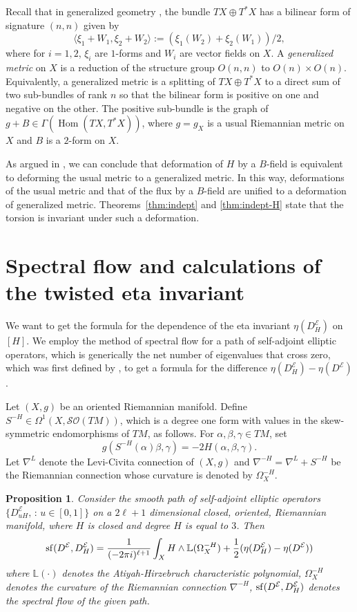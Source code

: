 \documentclass[12pt]{amsart}
\theoremstyle{plain}
\newtheorem{proposition}[theorem]{Proposition}
\theoremstyle{definition}
\theoremstyle{remark}
\begin{document}
{Recall that in generalized geometry \cite{Hi,Gua1}, the bundle
$TX\oplus T^*X$ has a bilinear form of signature $(n,n)$ given by
$$
\langle\xi_1+W_1,\xi_2+W_2\rangle:=(\xi_1(W_2)+\xi_2(W_1))/2,
$$
where for $i=1,2$, $\xi_i$ are $1$-forms and $W_i$ are vector fields on $X$. 
A {\em generalized metric} on $X$ is a reduction of the structure group
$O(n,n)$ to $O(n)\times O(n)$.
Equivalently, a generalized metric is a splitting of $TX\oplus T^*X$ to
a direct sum of two sub-bundles of rank $n$ so that the bilinear form is
positive on one and negative on the other.
The positive sub-bundle is the graph of $g+B\in\Gamma({\operatorname{Hom}}(TX,T^*X))$, where
$g=g_X$ is a usual Riemannian metric on $X$ and $B$ is a $2$-form on $X$. 

As argued in \cite{MW}, we can conclude that deformation of $H$ by a $B$-field is equivalent
to deforming the usual metric to a generalized metric.
In this way, deformations of the usual metric and that of the flux by a
$B$-field are unified to a deformation of generalized metric. 
Theorems~\ref{thm:indept} and \ref{thm:indept-H} state that the torsion is
invariant under such a deformation.

\section{Spectral flow and calculations of the twisted eta invariant}
\label{sect:calc} 

We want to get the formula for the dependence of the eta invariant $\eta(D^{\mathcal E}_H) $ on $[H]$.
We employ the method of 
spectral flow for a path of self-adjoint elliptic operators, which is generically the net number of eigenvalues
that cross zero, which was first defined by \cite{APS3}, to get a formula for the difference 
$\eta(D^{\mathcal E}_H) - \eta(D^{\mathcal E})$. 

Let $(X, g)$ be an oriented Riemannian manifold. 
Define $S^{-H} \in \Omega^1(X, {\mathcal S}{\mathcal O}(TM))$, which is a degree one form with values in 
the skew-symmetric endomorphisms of $TM$, as follows. For $\alpha, \beta, \gamma \in TM$, set 
$$
g(S^{-H} (\alpha)\beta, \gamma) = - 2H(\alpha, \beta, \gamma).
$$
Let $\nabla^L$ denote the Levi-Civita connection of $(X, g)$ and $\nabla^{-H} = \nabla^L + S^{-H} $ 
be the Riemannian connection whose curvature is denoted by $\Omega_X^{-H}$.

\begin{proposition}\label{prop:getzler}
Consider the smooth path of self-adjoint elliptic operators $\{D^{\mathcal E}_{uH}, \, : \, u\in [0,1]\}$
on a $2\ell +1$ dimensional closed, oriented, Riemannian manifold, where $H$ is closed and degree $H$ is equal to $3$. Then
$$
{\rm sf}(D^{\mathcal E}, D^{\mathcal E}_H) = \frac{1}{(-2\pi i)^{\ell+1}} \int_X H \wedge {\mathbb{L}}(\Omega_X^{-H}) + \frac{1}{2}(\eta(D^{\mathcal E}_H) - \eta(D^{\mathcal E}))
$$
where ${\mathbb{L}}(\cdot)$ denotes the Atiyah-Hirzebruch characteristic polynomial, $\Omega_X^{-H}$ denotes the curvature of the 
Riemannian connection $\nabla^{-H}$, ${\rm sf}(D^{\mathcal E}, D^{\mathcal E}_H)$ denotes the spectral flow of the given path.
\end{proposition}

}
\end{document}
